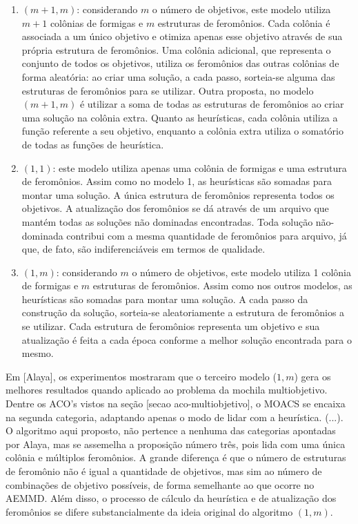 \begin{enumerate}
	\item $(m+1, m)$: considerando $m$ o número de objetivos, este modelo utiliza $m + 1$ colônias de formigas e $m$ estruturas de feromônios. Cada colônia é associada a um único objetivo e otimiza apenas esse objetivo através de sua própria estrutura de feromônios. Uma colônia adicional, que representa o conjunto de todos os objetivos, utiliza os feromônios das outras colônias de forma aleatória: ao criar uma solução, a cada passo, sorteia-se alguma das estruturas de feromônios para se utilizar. Outra proposta, no modelo $(m+1, m)$ é utilizar a soma de todas as estruturas de feromônios ao criar uma solução na colônia extra. Quanto as heurísticas, cada colônia utiliza a função referente a seu objetivo, enquanto a colônia extra utiliza o somatório de todas as funções de heurística.
	\item $(1,1)$: este modelo utiliza apenas uma colônia de formigas e uma estrutura de feromônios. Assim como no modelo 1, as heurísticas são somadas para montar uma solução. A única estrutura de feromônios representa todos os objetivos. A atualização dos feromônios se dá através de um arquivo que mantém todas as soluções não dominadas encontradas. Toda solução não-dominada contribui com a mesma quantidade de feromônios para arquivo, já que, de fato, são indiferenciáveis em termos de qualidade.
	\item $(1,m)$: considerando $m$ o número de objetivos, este modelo utiliza 1 colônia de formigas e $m$ estruturas de feromônios. Assim como nos outros modelos, as heurísticas são somadas para montar uma solução. A cada passo da construção da solução, sorteia-se aleatoriamente a estrutura de feromônios a se utilizar. Cada estrutura de feromônios representa um objetivo e sua atualização é feita a cada época conforme a melhor solução encontrada para o mesmo.
\end{enumerate}

Em [Alaya], os experimentos mostraram que o terceiro modelo ($1,m$) gera os melhores resultados quando aplicado ao problema da mochila multiobjetivo. Dentre os ACO's vistos na seção [secao aco-multiobjetivo], o MOACS se encaixa na segunda categoria, adaptando apenas o modo de lidar com a heurística. (...). O algoritmo aqui proposto, não pertence a nenhuma das categorias apontadas por Alaya, mas se assemelha a proposição número três, pois lida com uma única colônia e múltiplos feromônios. A grande diferença é que o número de estruturas de feromônio não é igual a quantidade de objetivos, mas sim ao número de combinações de objetivo possíveis, de forma semelhante ao que ocorre no AEMMD. Além disso, o processo de cálculo da heurística e de atualização dos feromônios se difere substancialmente da ideia original do algoritmo $(1,m)$.

